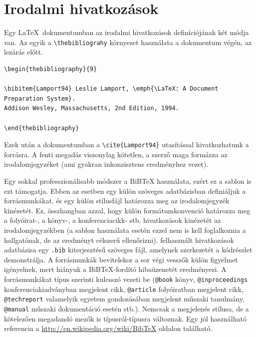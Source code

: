 \section{Irodalmi hivatkozások}
\label{sec:HowtoReference}
Egy \LaTeX~dokumentumban az irodalmi hivatkozások definíciójának két módja van. Az egyik a \verb+\thebibliograhy+ környezet használata a dokumentum végén, az \verb++ lezárás előtt.
\begin{lstlisting}
\begin{thebibliography}{9}

\bibitem{Lamport94} Leslie Lamport, \emph{\LaTeX: A Document Preparation System}.
Addison Wesley, Massachusetts, 2nd Edition, 1994.

\end{thebibliography}
\end{lstlisting}

Ezek után a dokumentumban a \verb+\cite{Lamport94}+ utasítással hivatkozhatunk a forrásra. A fenti megadás viszonylag kötetlen, a szerző maga formázza az irodalomjegyzéket (ami gyakran inkonzisztens eredményhez vezet).

Egy sokkal professzionálisabb módszer a BiB\TeX{} használata, ezért ez a sablon is ezt támogatja. Ebben az esetben egy külön szöveges adatbázisban definiáljuk a forrásmunkákat, és egy külön stílusfájl határozza meg az irodalomjegyzék kinézetét. Ez, összhangban azzal, hogy külön formátumkonvenció határozza meg a folyóirat-, a könyv-, a konferenciacikk- stb. hivatkozások kinézetét az irodalomjegyzékben (a sablon használata esetén ezzel nem is kell foglalkoznia a hallgatónak, de az eredményt célszerű ellenőrizni). felhasznált hivatkozások adatbázisa egy \verb+.bib+ kiterjesztésű szöveges fájl, amelynek szerkezetét a  kódrészlet demonstrálja. A forrásmunkák bevitelekor a sor végi vesszők külön figyelmet igényelnek, mert hiányuk a BiB\TeX-fordító hibaüzenetét eredményezi. A forrásmunkákat típus szerinti kulcsszó vezeti be (\verb+@book+ könyv, \verb+@inproceedings+ konferenciakiadványban megjelent cikk, \verb+@article+ folyóiratban megjelent cikk, \verb+@techreport+ valamelyik egyetem gondozásában megjelent műszaki tanulmány, \verb+@manual+ műszaki dokumentáció esetén stb.). Nemcsak a megjelenés stílusa, de a kötelezően megadandó mezők is típusról-típusra változnak. Egy jól használható referencia a \url{http://en.wikipedia.org/wiki/BibTeX} oldalon található.

